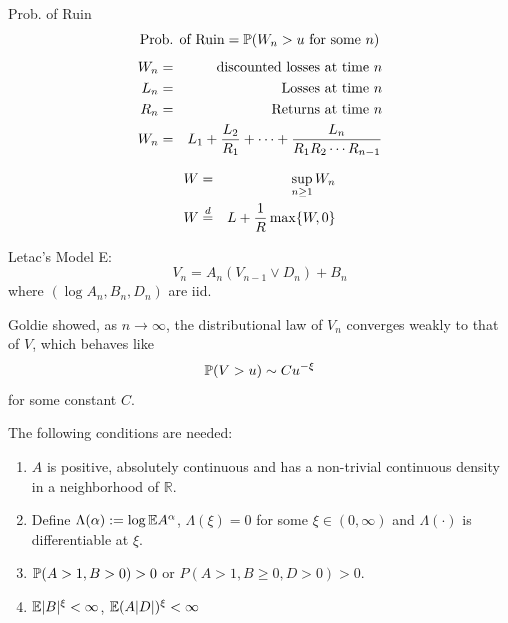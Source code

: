 \documentclass{beamer}
\begin{document}
\begin{frame}
  \begin{exampleblock}{Prob. of Ruin}
    \[
    \text{Prob. of Ruin} = \P(W_n > u \text{ for some }n)
    \]
    \begin{eqnarray*}
      W_n &=& \text{ discounted losses at time } n\\
      L_n &=& \text{ Losses at time } n \\
      R_n &=& \text{ Returns at time } n\\
      W_n &=& L_1 + {L_2 \over R_1} + \cdots +
      {L_n \over R_1 R_2 \cdots R_{n-1}}
    \end{eqnarray*}
  \end{exampleblock}
  \begin{eqnarray*}
    W &=& \sup_{n \geq 1} W_n \\
    W &\overset{d}{=}& L + {1 \over R} \max\{W, 0\}
  \end{eqnarray*}
\end{frame}

\begin{frame}
  Letac's Model E:
  \[
  V_n = A_n (V_{n-1} \vee D_n) + B_n
  \]
  where $(\log A_n, B_n, D_n)$ are iid.

Goldie showed, as $n \to \infty$, the distributional law of $V_n$ converges weakly to
that of $V$, which behaves like
\[
\P(V > u) \sim C u^{-\xi}
\]
for some constant $C$.
\end{frame}

\begin{frame}
  The following conditions are needed:
\begin{enumerate}
\item $A$ is positive, absolutely continuous and has a non-trivial continuous density in
  a neighborhood of $\mathbb R$.
\item Define $\Lambda(\alpha) := \log \E A^\alpha$, $\Lambda(\xi) = 0$ for some $\xi \in (0,
  \infty)$ and $\Lambda(\cdot)$ is differentiable at $\xi$.
\item $\P(A > 1, B > 0) > 0$ or $P(A > 1, B \geq 0, D > 0) > 0$.
\item $\E |B|^\xi < \infty$, $\E (A|D|)^\xi < \infty$
\end{enumerate}
\end{frame}
\end{document}
